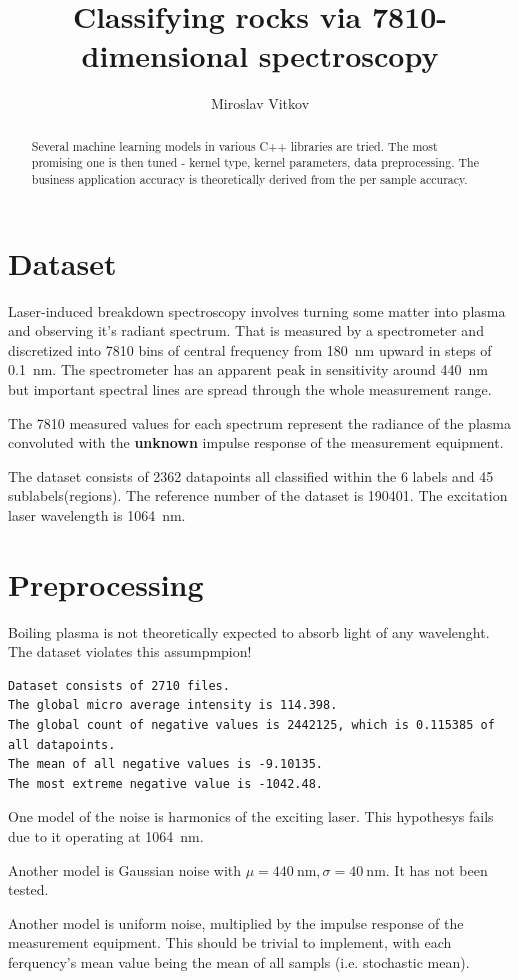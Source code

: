 \documentclass{article}
\title{Classifying rocks via 7810-dimensional spectroscopy}
\author{Miroslav Vitkov}
\begin{document}
\maketitle


\begin{abstract}
Several machine learning models in various C++ libraries are tried.
The most promising one is then tuned - kernel type, kernel parameters, data preprocessing.
The business application accuracy is theoretically derived from the per sample accuracy.
\end{abstract}


\section{Dataset}
Laser-induced breakdown spectroscopy\cite{libs_intro} involves turning some matter into plasma and observing it's radiant spectrum.
That is measured by a spectrometer and discretized into 7810 bins of central frequency from  \SI{180}{\nano\metre} upward in steps of \SI{0.1}{\nano\metre}.
The spectrometer has an apparent peak in sensitivity around \SI{440}{\nano\metre} but important spectral lines are spread through the whole measurement range.
\par
The 7810 measured values for each spectrum represent the radiance\cite{radiance} of the plasma convoluted with the \textbf{unknown} impulse response of the measurement equipment.
\par
The dataset consists of 2362 datapoints all classified within the 6 labels and 45 sublabels(regions).
The reference number of the dataset is 190401.
The excitation laser wavelength is \SI{1064}{\nano\metre}.

\section{Preprocessing}
Boiling plasma is not theoretically expected to absorb light of any wavelenght.
The dataset violates this assumpmpion!
\par
\begin{verbatim}
Dataset consists of 2710 files.
The global micro average intensity is 114.398.
The global count of negative values is 2442125, which is 0.115385 of all datapoints.
The mean of all negative values is -9.10135.
The most extreme negative value is -1042.48.
\end{verbatim}
\par
One model of the noise is harmonics of the exciting laser.
This  hypothesys fails due to it operating at \SI{1064}{\nano\metre}.
\par
Another model is Gaussian noise with $\mu=\SI{440}{\nano\metre}, \sigma=\SI{40}{\nano\metre}$.
It has not been tested.
\par
Another model is uniform noise, multiplied by the impulse response of the measurement equipment.
This should be trivial to implement, with each ferquency's mean value being the mean of all sampls (i.e. stochastic mean).
\end{document}
